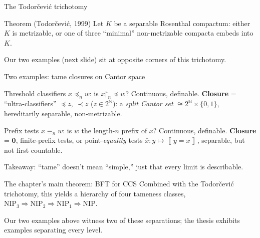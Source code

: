\documentclass[aspectratio=169]{beamer}
\renewcommand{\restriction}{\mathord{\upharpoonright}}
\newcommand{\Brack}[1]{\left\llbracket{#1}\right\rrbracket}
\begin{document}
\begin{frame}{The Todor\v{c}evi\'c trichotomy}
  \begin{block}{Theorem (Todor\v{c}evi\'c, 1999)}
    Let $K$ be a separable Rosenthal compactum: either $K$ is metrizable, or one of three ``minimal'' non-metrizable compacta embeds into $K$.
  \end{block}
  \centering
  \resizebox{!}{3.8cm}{}

  Our two examples (next slide) sit at opposite corners of this trichotomy.
\end{frame}

\begin{frame}{Two examples: tame closures on Cantor space}
  \begin{block}{Threshold classifiers}
    $x\preccurlyeq_n w$: is $x\restriction_n \preceq w$? Continuous, definable. \textbf{Closure} = ``ultra-classifiers'' $\preceq z,\ \prec z$ ($z\in 2^{\mathbb N}$): a \emph{split Cantor set} $\cong 2^{\mathbb N}\times\{0,1\}$, \alert{hereditarily separable, non-metrizable}.
  \end{block}
  \begin{block}{Prefix tests}
    $x\equiv_n w$: is $w$ the length-$n$ prefix of $x$? Continuous, definable. \textbf{Closure} = $\mathbf 0$, finite-prefix tests, or point-\emph{equality} tests $\bar x: y\mapsto\Brack{y=x}$, separable, but \alert{not first countable}.
  \end{block}
  Takeaway: ``tame'' doesn't mean ``simple,'' just that every limit is describable.
\end{frame}

\begin{frame}{The chapter's main theorem: BFT for CCS}
  Combined with the Todor\v{c}evi\'c trichotomy, this yields a hierarchy of \alert{four} tameness classes, $\mathrm{NIP}_3\Rightarrow\mathrm{NIP}_2\Rightarrow\mathrm{NIP}_1\Rightarrow\mathrm{NIP}$.

  Our two examples above witness two of these separations; the thesis exhibits examples separating every level.
\end{frame}

\end{document}
